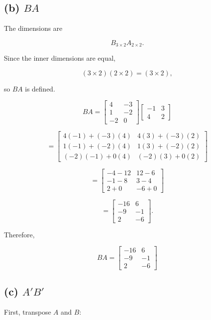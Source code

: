 \documentclass[12pt]{article}
\begin{document}
	\subsection*{(b) $BA$}
	
	The dimensions are
	
	\[
	B_{3\times2}A_{2\times2}.
	\]
	
	Since the inner dimensions are equal,
	
	\[
	(3\times2)(2\times2)=(3\times2),
	\]
	
	so $BA$ is defined.
	
	\[
	BA
	=
	\begin{bmatrix}
		4 & -3\\
		1 & -2\\
		-2 & 0
	\end{bmatrix}
	\begin{bmatrix}
		-1 & 3\\
		4 & 2
	\end{bmatrix}
	\]
	
	\[
	=
	\begin{bmatrix}
		4(-1)+(-3)(4) &
		4(3)+(-3)(2)
		\\
		1(-1)+(-2)(4) &
		1(3)+(-2)(2)
		\\
		(-2)(-1)+0(4) &
		(-2)(3)+0(2)
	\end{bmatrix}
	\]
	
	\[
	=
	\begin{bmatrix}
		-4-12 & 12-6\\
		-1-8 & 3-4\\
		2+0 & -6+0
	\end{bmatrix}
	\]
	
	\[
	=
	\begin{bmatrix}
		-16 & 6\\
		-9 & -1\\
		2 & -6
	\end{bmatrix}.
	\]
	
	Therefore,
	
	\[
	\boxed{
		BA =
		\begin{bmatrix}
			-16 & 6\\
			-9 & -1\\
			2 & -6
	\end{bmatrix}}
	\]
	
	\subsection*{(c) $A'B'$}
	
	First, transpose $A$ and $B$:
	
\end{document}
